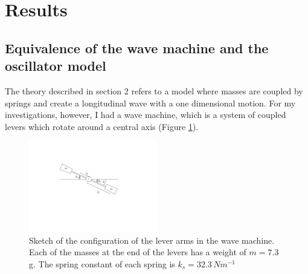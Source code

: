 \documentclass[12pt]{article}
\begin{document}
\section{Results}\label{sec:section5}
\subsection{Equivalence of the wave machine and the oscillator model}\label{sec:results:equivalence}
The theory described in section 2 refers to a model where masses are coupled by springs and create a longitudinal wave with a one dimensional motion. For my investigations, however, I had a wave machine, which is a system of coupled levers which rotate around a central axis (Figure \ref{fig:config}). 
\begin{figure}[hbt]
  \includegraphics[width=0.5\textwidth]{equivalance_new.pdf}
  \caption{Sketch of the configuration of the lever arms in the wave machine. Each of the masses at the end of the levers has a weight of $m=7.3$ g. The spring constant of each spring is $k_s=32.3\, Nm^{-1}$}\label{fig:config}
\end{figure}
\end{document}
